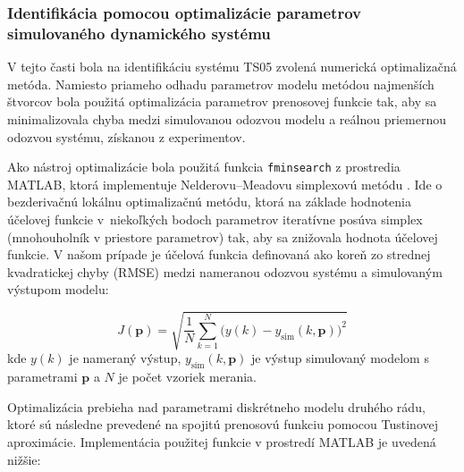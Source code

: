
\subsubsection{Identifikácia pomocou optimalizácie parametrov simulovaného dynamického systému}

V tejto časti bola na identifikáciu systému TS05 zvolená numerická optimalizačná metóda.  
Namiesto priameho odhadu parametrov modelu metódou najmenších štvorcov bola použitá optimalizácia parametrov prenosovej funkcie tak,  
aby sa minimalizovala chyba medzi simulovanou odozvou modelu a reálnou priemernou odozvou systému, získanou z experimentov.

Ako nástroj optimalizácie bola použitá funkcia \texttt{fminsearch} z prostredia MATLAB,  
ktorá implementuje Nelderovu–Meadovu simplexovú metódu \cite{hudzovic2000}.  
Ide o bezderivačnú lokálnu optimalizačnú metódu, ktorá na základe hodnotenia účelovej funkcie v~niekoľkých bodoch parametrov iteratívne posúva simplex (mnohouholník v priestore parametrov) tak, aby sa znižovala hodnota účelovej funkcie.  
V našom prípade je účelová funkcia definovaná ako koreň zo strednej kvadratickej chyby (RMSE) medzi nameranou odozvou systému a simulovaným výstupom modelu:

\begin{equation}
    J(\mathbf{p}) = 
    \sqrt{
        \frac{1}{N} 
        \sum_{k=1}^{N} 
        \bigl(y(k) - y_{\text{sim}}(k,\mathbf{p})\bigr)^2
    }
    \label{eq:rmse_function}
\end{equation}
kde $y(k)$ je nameraný výstup, $y_{\text{sim}}(k,\mathbf{p})$ je výstup simulovaný modelom s parametrami $\mathbf{p}$  
a $N$ je počet vzoriek merania.






Optimalizácia prebieha nad parametrami diskrétneho modelu druhého rádu, ktoré sú následne prevedené na spojitú prenosovú funkciu pomocou Tustinovej aproximácie.  
Implementácia použitej funkcie v prostredí MATLAB je uvedená nižšie:

